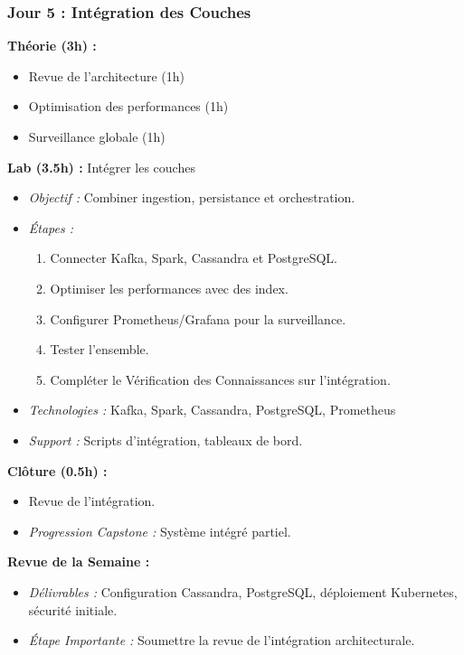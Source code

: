 \documentclass[11pt]{article}
\begin{document}
\subsubsection{Jour 5 : Intégration des Couches}
\textbf{Théorie (3h) :}
\begin{itemize}
    \item Revue de l'architecture (1h)
    \item Optimisation des performances (1h)
    \item Surveillance globale (1h)
\end{itemize}
\textbf{Lab (3.5h) :} Intégrer les couches
\begin{itemize}
    \item \textit{Objectif :} Combiner ingestion, persistance et orchestration.
    \item \textit{Étapes :}
        \begin{enumerate}
            \item Connecter Kafka, Spark, Cassandra et PostgreSQL.
            \item Optimiser les performances avec des index.
            \item Configurer Prometheus/Grafana pour la surveillance.
            \item Tester l'ensemble.
            \item Compléter le Vérification des Connaissances sur l'intégration.
        \end{enumerate}
    \item \textit{Technologies :} Kafka, Spark, Cassandra, PostgreSQL, Prometheus
    \item \textit{Support :} Scripts d'intégration, tableaux de bord.
\end{itemize}
\textbf{Clôture (0.5h) :}
\begin{itemize}
    \item Revue de l'intégration.
    \item \textit{Progression Capstone :} Système intégré partiel.
\end{itemize}

\textbf{Revue de la Semaine :}
\begin{itemize}
    \item \textit{Délivrables :} Configuration Cassandra, PostgreSQL, déploiement Kubernetes, sécurité initiale.
    \item \textit{Étape Importante :} Soumettre la revue de l'intégration architecturale.
\end{itemize}
\end{document}
